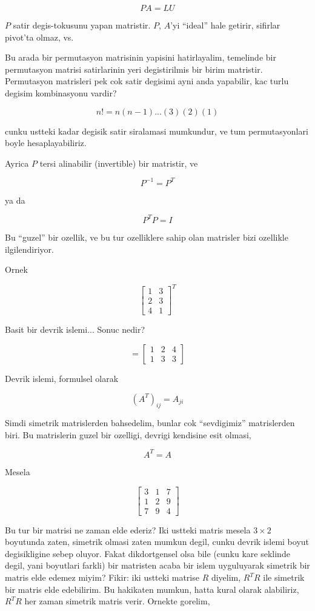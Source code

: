 \documentclass[12pt,fleqn]{article}\usepackage{../common}
\begin{document}
$$ PA = LU $$

$P$ satir degis-tokusunu yapan matristir. $P$, $A$'yi ``ideal'' hale
getirir, sifirlar pivot'ta olmaz, vs. 

Bu arada bir permutasyon matrisinin yapisini hatirlayalim, temelinde bir
permutasyon matrisi satirlarinin yeri degistirilmis bir birim
matristir. Permutasyon matrisleri pek cok satir degisimi ayni anda
yapabilir, kac turlu degisim kombinasyonu vardir? 

$$ n! = n(n-1)...(3)(2)(1) $$

cunku ustteki kadar degisik satir siralamasi mumkundur, ve tum
permutasyonlari boyle hesaplayabiliriz. 

Ayrica $P$ tersi alinabilir (invertible) bir matristir, ve 

$$ P^{-1} = P^T $$

ya da 

$$ P^TP = I $$

Bu ``guzel'' bir ozellik, ve bu tur ozelliklere sahip olan matrisler bizi
ozellikle ilgilendiriyor.

Ornek

$$ 
\left[\begin{array}{rr}
1 & 3 \\
2 & 3 \\
4 & 1 
\end{array}\right]^T
 $$

Basit bir devrik islemi... Sonuc nedir?

$$ =
\left[\begin{array}{rrr}
1 & 2 & 4 \\
1 & 3 & 3 
\end{array}\right]
 $$

Devrik islemi, formulsel olarak 

$$ (A^T)_{ij} = A_{ji} $$

Simdi simetrik matrislerden bahsedelim, bunlar cok ``sevdigimiz''
matrislerden biri. Bu matrislerin guzel bir ozelligi, devrigi kendisine
esit olmasi,

$$ A^T = A $$

Mesela

$$ 
\left[\begin{array}{rrr}
3 & 1 & 7 \\
1 & 2 & 9 \\
7 & 9 & 4
\end{array}\right]
 $$

Bu tur bir matrisi ne zaman elde ederiz? Iki ustteki matris mesela $3
\times 2$ boyutunda zaten, simetrik olmasi zaten mumkun degil, cunku devrik
islemi boyut degisikligine sebep oluyor. Fakat dikdortgensel olsa bile
(cunku kare seklinde degil, yani boyutlari farkli) bir matristen acaba bir
islem uyguluyarak simetrik bir matris elde edemez miyim? Fikir: iki ustteki
matrise $R$ diyelim, $R^TR$ ile simetrik bir matris elde edebilirim. Bu
hakikaten mumkun, hatta kural olarak alabiliriz, $R^TR$ her zaman simetrik
matris verir. Ornekte gorelim, 
\end{document}
